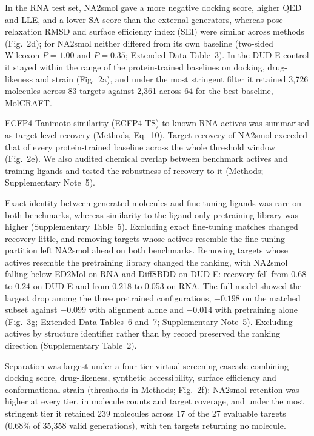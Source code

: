 \documentclass[pdflatex,sn-mathphys-num]{sn-jnl}
\theoremstyle{thmstyleone}
\theoremstyle{thmstyletwo}
\theoremstyle{thmstylethree}
\begin{document}
In the RNA test set, NA2smol gave a more negative docking score, higher QED and LLE, and a lower SA score than the external generators, whereas pose-relaxation RMSD and surface efficiency index (SEI) were similar across methods (Fig.~2d); for NA2smol neither differed from its own baseline (two-sided Wilcoxon $P=1.00$ and $P=0.35$; Extended Data Table~3). In the DUD-E control it stayed within the range of the protein-trained baselines on docking, drug-likeness and strain (Fig.~2a), and under the most stringent filter it retained 3,726 molecules across 83 targets against 2,361 across 64 for the best baseline, MolCRAFT.

ECFP4 Tanimoto similarity (ECFP4-TS) to known RNA actives was summarised as target-level recovery (Methods, Eq.~10). Target recovery of NA2smol exceeded that of every protein-trained baseline across the whole threshold window (Fig.~2e). We also audited chemical overlap between benchmark actives and training ligands and tested the robustness of recovery to it (Methods; Supplementary Note~5).

Exact identity between generated molecules and fine-tuning ligands was rare on both benchmarks, whereas similarity to the ligand-only pretraining library was higher (Supplementary Table~5). Excluding exact fine-tuning matches changed recovery little, and removing targets whose actives resemble the fine-tuning partition left NA2smol ahead on both benchmarks. Removing targets whose actives resemble the pretraining library changed the ranking, with NA2smol falling below ED2Mol on RNA and DiffSBDD on DUD-E: recovery fell from 0.68 to 0.24 on DUD-E and from 0.218 to 0.053 on RNA. The full model showed the largest drop among the three pretrained configurations, $-0.198$ on the matched subset against $-0.099$ with alignment alone and $-0.014$ with pretraining alone (Fig.~3g; Extended Data Tables~6 and~7; Supplementary Note~5). Excluding actives by structure identifier rather than by record preserved the ranking direction (Supplementary Table~2).

Separation was largest under a four-tier virtual-screening cascade combining docking score, drug-likeness, synthetic accessibility, surface efficiency and conformational strain (thresholds in Methods; Fig.~2f): NA2smol retention was higher at every tier, in molecule counts and target coverage, and under the most stringent tier it retained 239 molecules across 17 of the 27 evaluable targets (0.68\% of 35,358 valid generations), with ten targets returning no molecule.
\end{document}
